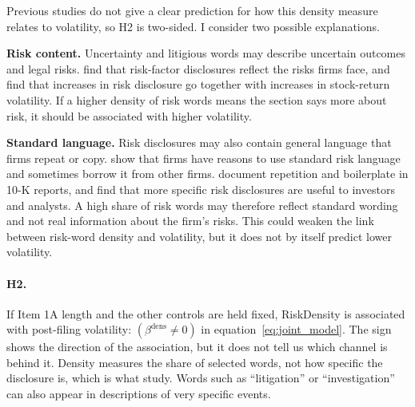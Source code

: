 Previous studies do not give a clear prediction for how this density measure
relates to volatility, so H2 is two-sided. I consider two possible
explanations.

\textbf{Risk content.} Uncertainty and litigious words may describe uncertain
outcomes and legal risks. \textcite{campbell2014} find that risk-factor
disclosures reflect the risks firms face, and \textcite{kravet2013} find that
increases in risk disclosure go together with increases in stock-return
volatility. If a higher density of risk words means the section says more
about risk, it should be associated with higher volatility.

\textbf{Standard language.} Risk disclosures may also contain general
language that firms repeat or copy. \textcite{cazier2021} show that firms have
reasons to use standard risk language and sometimes borrow it from other
firms. \textcite{dyer2017} document repetition and boilerplate in 10-K
reports, and \textcite{hope2016} find that more specific risk disclosures are
useful to investors and analysts. A high share of risk words may therefore
reflect standard wording and not real information about the firm's risks.
This could weaken the link between risk-word density and volatility, but it
does not by itself predict lower volatility.

\paragraph{H2.} If Item 1A length and the other controls are held fixed,
RiskDensity is associated with post-filing volatility: $(\beta^{\text{dens}}\neq 0)$ in equation~\eqref{eq:joint_model}. The sign shows the direction of the association, but it does not tell us which channel is behind it. Density measures the share of selected words, not how specific the disclosure is, which is what \textcite{hope2016} study. Words such as ``litigation'' or ``investigation'' can also appear in descriptions of very specific events.

